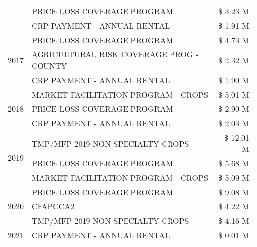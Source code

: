 \begin{tabular}{llr}
 & PRICE LOSS COVERAGE PROGRAM & \$ 3.23 M \\
 & CRP PAYMENT - ANNUAL RENTAL & \$ 1.91 M \\
\cline{1-3}
\multirow[t]{3}{*}{2017} & PRICE LOSS COVERAGE PROGRAM & \$ 4.73 M \\
 & AGRICULTURAL RISK COVERAGE PROG - COUNTY & \$ 2.32 M \\
 & CRP PAYMENT - ANNUAL RENTAL & \$ 1.90 M \\
\cline{1-3}
\multirow[t]{3}{*}{2018} & MARKET FACILITATION PROGRAM - CROPS & \$ 5.01 M \\
 & PRICE LOSS COVERAGE PROGRAM & \$ 2.90 M \\
 & CRP PAYMENT - ANNUAL RENTAL & \$ 2.03 M \\
\cline{1-3}
\multirow[t]{3}{*}{2019} & TMP/MFP 2019 NON SPECIALTY CROPS & \$ 12.01 M \\
 & PRICE LOSS COVERAGE PROGRAM & \$ 5.68 M \\
 & MARKET FACILITATION PROGRAM - CROPS & \$ 5.09 M \\
\cline{1-3}
\multirow[t]{3}{*}{2020} & PRICE LOSS COVERAGE PROGRAM & \$ 9.08 M \\
 & CFAPCCA2 & \$ 4.22 M \\
 & TMP/MFP 2019 NON SPECIALTY CROPS & \$ 4.16 M \\
\cline{1-3}
2021 & CRP PAYMENT - ANNUAL RENTAL & \$ 0.01 M \\
\cline{1-3}
\bottomrule
\end{tabular}
